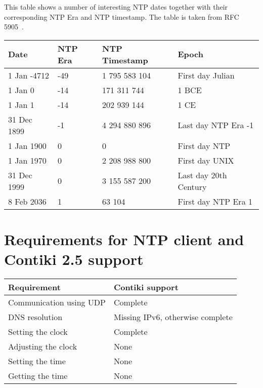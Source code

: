 This table shows a number of interesting NTP dates
together with their corresponding NTP Era and NTP timestamp.
The table is taken from RFC 5905~\cite{rfc5905}.

\vspace{1cm}

\begin{tabular}{|l|l|l|l|}
	\hline
	Date & NTP Era & NTP Timestamp & Epoch \\ \hline
	1 Jan -4712 & -49 & 1 795 583 104 & First day Julian \\
	1 Jan 0 & -14 & 171 311 744 & 1 BCE \\
	1 Jan 1 & -14 & 202 939 144 & 1 CE \\
	31 Dec 1899 & -1 & 4 294 880 896 & Last day NTP Era -1 \\
	1 Jan 1900 & 0 & 0 & First day NTP \\
	1 Jan 1970 & 0 & 2 208 988 800 & First day UNIX \\
	31 Dec 1999 & 0 & 3 155 587 200 & Last day 20th Century \\
	8 Feb 2036 & 1 & 63 104 & First day NTP Era 1 \\
	\hline
\end{tabular}

\chapter{Requirements for NTP client and Contiki 2.5 support}\label{app:requirements}
\begin{tabular}{|l|l|}
	\hline
	Requirement & Contiki support \\ \hline
	Communication using UDP & Complete \\
	DNS resolution & Missing IPv6, otherwise complete \\
	Setting the clock & Complete \\
	Adjusting the clock & None \\
	Setting the time & None \\
	Getting the time & None \\
	\hline
\end{tabular}


